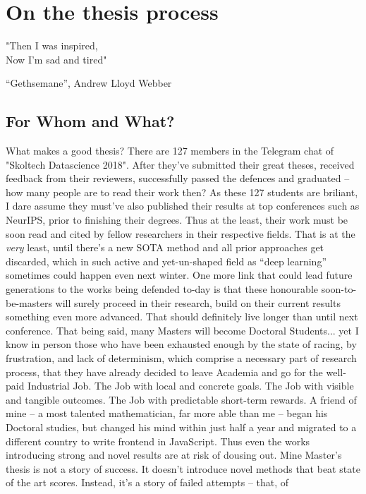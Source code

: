 \chapter{On the thesis process} \label{chap:processes}

\epigraph{"Then I was inspired,\\
Now I'm sad and tired"
}{``Gethsemane'', Andrew Lloyd Webber}

\section*{For Whom and What?}

What makes a good thesis? There are 127 members in the Telegram chat of
"Skoltech Datascience 2018". After they've submitted their great theses,
received feedback from their reviewers, successfully passed the defences and
graduated -- how many people are to read their work then? As these 127 students
are briliant, I dare assume they must've also published their results at top
conferences such as NeurIPS, prior to finishing their degrees. Thus at the
least, their work must be soon read and cited by fellow researchers in their
respective fields.  That is at the \emph{very} least, until there's a new SOTA
method and all prior approaches get discarded, which in such active and
yet-un-shaped field as ``deep learning'' sometimes could happen even next
winter. One more link that could lead future generations to the works being
defended to-day is that these honourable soon-to-be-masters will surely proceed
in their research, build on their current results something even more advanced.
That should definitely live longer than until next conference.  That being
said, many Masters will become Doctoral Students... yet I know in person those
who have been exhausted enough by the state of racing, by frustration, and lack
of determinism, which comprise a necessary part of research process, that they
have already decided to leave Academia and go for the well-paid Industrial Job.
The Job with local and concrete goals.  The Job with visible and tangible
outcomes. The Job with predictable short-term rewards.  A friend of mine -- a
most talented mathematician, far more able than me -- began his Doctoral
studies, but changed his mind within just half a year and migrated to a
different country to write frontend in JavaScript. Thus even the works
introducing strong and novel results are at risk of dousing out. Mine Master's
thesis is not a story of success. It doesn't introduce novel methods that beat
state of the art scores. Instead, it's a story of failed attempts -- that, of
